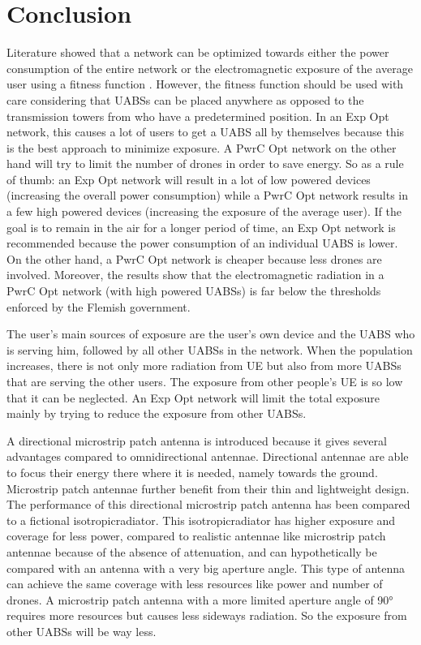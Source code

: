 \documentclass[twocolumn]{phdsymp} %
\begin{document}
\section{Conclusion}
Literature showed that a network can be optimized towards either the power consumption of the entire network 
or the electromagnetic exposure of the average user using a fitness function \cite{J1}.
However, the fitness function should be used with care considering that \gls{UABS}s can be placed anywhere as opposed to 
the transmission towers from \cite{J1} who have a predetermined position. 
In an \gls{Exp Opt} network, this causes a lot of users to get a \gls{UABS} all by 
themselves because this is the best approach to minimize exposure.
A \gls{PwrC Opt} network on the other hand will try to limit the number of drones 
in order to save energy. 
So as a rule of thumb: an \gls{Exp Opt} network will result in a lot of low powered devices (increasing the overall power consumption)
while a \gls{PwrC Opt} network results in a few high powered devices (increasing the exposure of the average user).
If the goal is to remain in the air for a longer period of time, an \gls{Exp Opt} network is recommended because the power consumption of 
an individual \gls{UABS} is lower.
On the other hand, a \gls{PwrC Opt} network is cheaper because less drones are involved. 
Moreover, the results show that the electromagnetic radiation in a \gls{PwrC Opt} network (with high powered \gls{UABS}s)
is far below the thresholds enforced by the Flemish government.

The user's main sources of exposure are the user's own device and the \gls{UABS} who is serving him, followed by all
other \gls{UABS}s in the network. 
When the population increases, there is not only more radiation from \gls{UE} but also 
from more \gls{UABS}s that are serving the other users.
The exposure from other people's \gls{UE} is so low that it can be neglected.
An \gls{Exp Opt} network will limit the total exposure mainly by trying to reduce the exposure from other \gls{UABS}s.

A directional microstrip patch antenna is introduced because it gives several advantages compared to omnidirectional antennae.
Directional antennae are able to focus their energy there where it is needed, namely towards the ground. Microstrip patch antennae 
further benefit from their thin and lightweight design. The performance 
of this directional microstrip patch antenna has been compared to a 
fictional \gls{isotropicradiator}.
This \gls{isotropicradiator} has higher exposure and coverage for less power, compared to realistic antennae like microstrip patch antennae
because of the absence of attenuation, and can hypothetically be compared with an antenna with a very big aperture angle.
This type of antenna can achieve the same coverage with less
resources like power and number of drones. 
A microstrip patch antenna with a more limited aperture angle of \ang{90} requires more resources but 
causes less sideways radiation. So the exposure from other \gls{UABS}s will be way less.
\end{document}
